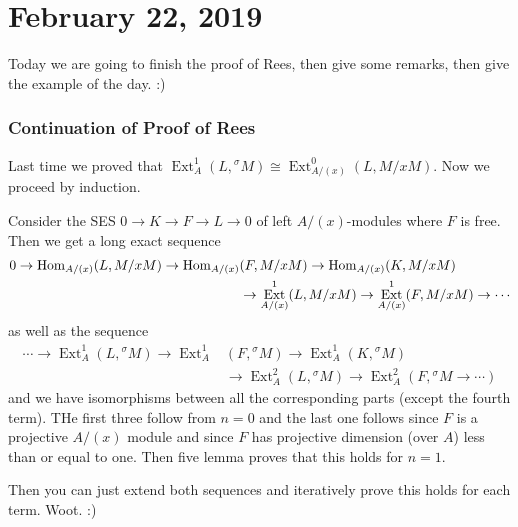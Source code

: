 \documentclass[12pt]{article}
\theoremstyle{break}
\theoremstyle{nonumberbreak}
\theoremstyle{changebreak}
\theoremstyle{break}
\theoremstyle{nonumberbreak}
\theoremstyle{nonumberplain}
\theoremstyle{change}
\DeclareMathOperator{\Ext}{Ext}
\newcommand*{\Hom}{\ensuremath\text{Hom}}
\begin{document}
\section{February 22, 2019}
Today we are going to finish the proof of Rees, then give some remarks, then give the example of the day. :)

\subsubsection{Continuation of Proof of Rees}
Last time we proved that $\Ext_{A}^1(L,{^\sigma M})\cong \Ext_{A/(x)}^0(L,M/xM)$. Now we proceed by induction.

Consider the SES $0\to K\to F\to L\to 0$ of left $A/(x)$-modules where $F$ is free. Then we get a long exact sequence
\begin{align*}
	0\to \Hom_{A/(x)}(L,M/xM)\to \Hom_{A/(x)}&(F,M/xM)\to \Hom_{A/(x)}(K,M/xM)\\
	&\to \Ext^1_{A/(x)}(L,M/xM)\to\Ext^1_{A/(x)}(F,M/xM)\to\cdots
\end{align*}
as well as the sequence
\begin{align*}
	\cdots \to \Ext^1_{A}(L,{^\sigma M})\to \Ext^1_{A}&(F,{^\sigma M})\to \Ext^1_{A}(K,{^\sigma M})\\
	&\to \Ext^2_{A}(L,{^\sigma M})\to \Ext^2_{A}(F,{^\sigma M}\to\cdots)
\end{align*}
and we have isomorphisms between all the corresponding parts (except the fourth term). THe first three 
follow from $n=0$ and the last one follows since $F$ is a projective $A/(x)$ module and since $F$ has projective dimension (over $A$) 
less than or equal to one. Then five lemma proves that this holds for $n=1$.

Then you can just extend both sequences and iteratively prove this holds for each term. Woot. :)
\end{document}
